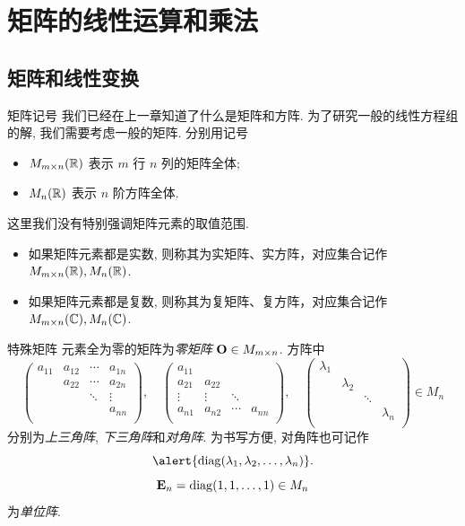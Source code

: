 \section{矩阵的线性运算和乘法}

\subsection{矩阵和线性变换}

\begin{frame}{矩阵记号}
	\onslide<+->
	我们已经在上一章知道了什么是矩阵和方阵. 为了研究一般的线性方程组的解, 我们需要考虑一般的矩阵. 
	\onslide<+->
	分别用记号
	\begin{itemize}
		\item $M_{m\times n}({\mathbb{R}})$ 表示 $m$ 行 $n$ 列的矩阵全体;
		\item $M_n({\mathbb{R}})$ 表示 $n$ 阶方阵全体.
	\end{itemize}
	\onslide<+->
	这里我们没有特别强调矩阵元素的取值范围.
	\onslide<+->
	\begin{itemize}
		\item 如果矩阵元素都是实数, 则称其为实矩阵、实方阵，对应集合记作 $M_{m\times n}({\mathbb{R}}), M_n({\mathbb{R}})$.
		\item 如果矩阵元素都是复数, 则称其为复矩阵、复方阵，对应集合记作 $M_{m\times n}({\mathbb{C}}), M_n({\mathbb{C}})$.
	\end{itemize}
\end{frame}


\begin{frame}{特殊矩阵}
	\onslide<+->
	元素全为零的矩阵为\emph{零矩阵} ${\mathbf{O}}\in M_{m\times n}$.
	\onslide<+->
	方阵中
	\[\begin{pmatrix}
		a_{11}&a_{12}&\cdots&a_{1n}\\
		&a_{22}&\cdots&a_{2n}\\
		&&\ddots&\vdots\\
		&&&a_{nn}\\
	\end{pmatrix},\quad\begin{pmatrix}
		a_{11}&&&\\
		a_{21}&a_{22}&&\\
		\vdots&\vdots&\ddots&\\
		a_{n1}&a_{n2}&\cdots&a_{nn}\\
	\end{pmatrix},\quad\begin{pmatrix}
		\lambda_1&&&\\
		&\lambda_2&&\\
		&&\ddots&\\
		&&&\lambda_n\\
	\end{pmatrix}\in M_n\]
	分别为\emph{上三角阵}, \emph{下三角阵}和\emph{对角阵}.
	\onslide<+->
	为书写方便, 对角阵也可记作
	\[\alert{\diag(\lambda_1,\lambda_2,\dots,\lambda_n)}.\]
	\onslide<+->
	\[{\mathbf{E}}_n={\mathrm{diag}}(1,1,\dots,1)\in M_n\]
	为\emph{单位阵}.
\end{frame}


